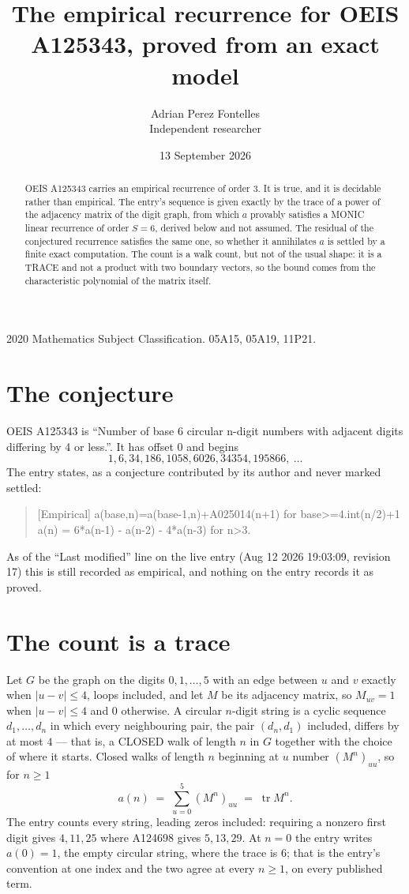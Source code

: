 \documentclass[11pt,a4paper]{article}
\title{The empirical recurrence for OEIS A125343, proved from an exact model}
\author{Adrian Perez Fontelles\\ \small Independent researcher}
\date{13 September 2026}
\theoremstyle{plain}
\theoremstyle{definition}
\begin{document}
\maketitle

\begin{abstract}
OEIS A125343 carries an empirical recurrence of order $3$. It is true, and it is
decidable rather than empirical. The entry's sequence is given exactly by the trace of a power of the adjacency matrix of the digit graph, from
which $a$ provably satisfies a MONIC linear recurrence of order $S=6$, derived below and not
assumed. The residual of the conjectured recurrence satisfies the same one, so whether it
annihilates $a$ is settled by a finite exact computation. The count is a walk count, but not of the usual shape: it is a TRACE and not a product with two boundary vectors, so the bound comes from the characteristic polynomial of the matrix itself.
\end{abstract}

\noindent\small 2020 Mathematics Subject Classification. 05A15, 05A19, 11P21.\normalsize

\section{The conjecture}

OEIS A125343 is ``Number of base 6 circular n-digit numbers with adjacent digits differing by 4 or less.''. It has offset $0$ and begins
\[
1, 6, 34, 186, 1058, 6026, 34354, 195866,\ \dots
\]
The entry states, as a conjecture contributed by its author and never marked settled:
\begin{quote}
[Empirical] a(base,n)=a(base-1,n)+A025014(n+1) for base>=4.int(n/2)+1 a(n) = 6*a(n-1) - a(n-2) - 4*a(n-3) for n>3.
\end{quote}
As of the ``Last modified'' line on the live entry (Aug 12 2026 19:03:09, revision 17)
this is still recorded as empirical, and nothing on the entry records it as proved.

\section{The count is a trace}

Let $G$ be the graph on the digits $0,1,\dots,5$ with an edge between $u$ and $v$ exactly
when $|u-v|\le4$, loops included, and let $M$ be its adjacency matrix, so $M_{uv}=1$ when
$|u-v|\le4$ and $0$ otherwise. A circular $n$-digit string is a cyclic sequence
$d_1,\dots,d_n$ in which every neighbouring pair, the pair $(d_n,d_1)$ included, differs by at
most $4$ --- that is, a CLOSED walk of length $n$ in $G$ together with the choice of where it
starts. Closed walks of length $n$ beginning at $u$ number $(M^n)_{uu}$, so for $n\ge1$
\[
a(n)\;=\;\sum_{u=0}^{5}(M^{n})_{uu}\;=\;\operatorname{tr}M^{n} .
\]
The entry counts every string, leading zeros included: requiring a nonzero first digit gives
$4,11,25$ where A124698 gives $5,13,29$. At $n=0$ the entry writes $a(0)=1$, the empty circular
string, where the trace is $6$; that is the entry's convention at one index and the two agree
at every $n\ge1$, on every published term.
\end{document}

